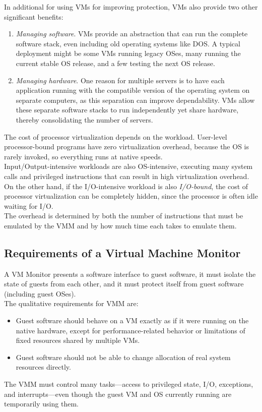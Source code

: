 \documentclass[12pt]{article}
\theoremstyle{definition}
\begin{document}
  In additional for using VMs for improving protection, VMs also provide two other significant benefits:
  \begin{enumerate}
    \item \emph{Managing software}. VMs provide an abstraction that can run the complete software stack, even including old operating systems like DOS.
    A typical deployment might be some VMs running legacy OSes, many running the current stable OS release, and a few testing the next OS release.
    \item \emph{Managing hardware}. One reason for multiple servers is to have each application running with the compatible version of the operating system on separate computers, as this separation can improve dependability.
    VMs allow these separate software stacks to run independently yet share hardware, thereby consolidating the number of servers.
  \end{enumerate}

  The cost of processor virtualization depends on the workload.
  User-level processor-bound programs have zero virtualization overhead, because the OS is rarely invoked, so everything runs at native speeds. \\
  Input/Output-intensive workloads are also OS-intensive, executing many system calls and privileged instructions that can result in high virtualization overhead.
  On the other hand, if the I/O-intensive workload is also \emph{I/O-bound}, the cost of processor virtualization can be completely hidden, since the processor is often idle waiting for I/O. \\

  The overhead is determined by both the number of instructions that must be emulated by the VMM and by how much time each takes to emulate them.

  \subsection{Requirements of a Virtual Machine Monitor}
  A VM Monitor presents a software interface to guest software, it must isolate the state of guests from each other, and it must protect itself from guest software (including guest OSes). \\
  The qualitative requirements for VMM are:
  \begin{itemize}
    \item Guest software should behave on a VM exactly as if it were running on the native hardware, except for performance-related behavior or limitations of fixed resources shared by multiple VMs.
    \item Guest software should not be able to change allocation of real system resources directly.
  \end{itemize}
  The VMM must control many tasks---access to privileged state, I/O, exceptions, and interrupts---even though the guest VM and OS currently running are temporarily using them. \\
\end{document}
